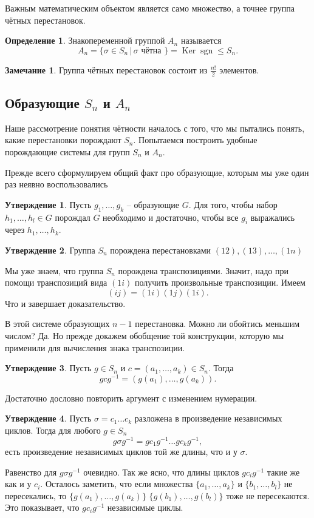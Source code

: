 \documentclass[10pt,a4paper,oneside]{book}
\theoremstyle{definition}
\newtheorem*{rem}{\color{green!50!blue}Замечание}
\newtheorem*{defn}{\color{yellow!30!red} Определение}
\newtheorem{utvr}{\color{blue!50!black}Утверждение}
\renewcommand{\leq}{\leqslant}
\DeclareMathOperator{\Ker}{Ker}
\newcommand{\sgn}{\operatorname{sgn}}
\def\dfn{\begin{defn}}
\def\edfn{\end{defn}}
\def\rm{\begin{rem}}
\def\erm{\end{rem}}
\def\utv{\begin{utvr}}
\def\eutv{\end{utvr}}
\begin{document}
Важным математическим объектом является само множество, а точнее группа чётных перестановок.

\dfn Знакопеременной группой $A_n$ называется
$$A_n=\{\sigma \in S_n\,|\, \sigma \text{ чётна } \} = \Ker \sgn \leq S_n.$$
\edfn

\rm Группа чётных перестановок состоит из $\frac{n!}{2}$ элементов.
\erm

\subsection{Образующие $S_n$ и $A_n$}

Наше рассмотрение понятия чётности началось с того, что мы пытались понять, какие перестановки порождают $S_n$. Попытаемся построить удобные порождающие системы для групп $S_n$ и $A_n$.

Прежде всего сформулируем общий факт про образующие, которым мы уже один раз неявно воспользовались

\utv Пусть $g_1,\dots,g_k $ -- образующие $G$. Для того, чтобы набор $h_1,\dots,h_l\in G$ порождал  $G$ необходимо и достаточно, чтобы все $g_i$ выражались через $h_1,\dots,h_k$. 
\eutv

\utv Группа $S_n$ порождена перестановками $(12), (13),\dots, (1n)$
\eutv
\proof Мы уже знаем, что группа $S_n$ порождена транспозициями. Значит, надо при помощи транспозиций вида $(1i)$ получить произвольные транспозиции.  Имеем
$$(ij)=(1i)(1j)(1i).$$
Что и завершает доказательство.
\endproof

В этой системе образующих $n-1$ перестановка. Можно ли обойтись меньшим числом? Да. Но прежде докажем обобщение той конструкции, которую мы применили для вычисления знака транспозиции.

\utv Пусть $g\in S_n$ и $c=(a_1,\dots,a_k)\in S_n$. Тогда 
$$gcg^{-1}=(g(a_1),\dots,g(a_k)).$$
\eutv
\proof Достаточно дословно повторить аргумент с изменением нумерации.
\endproof

\utv Пусть $\sigma=c_1\dots c_k$ разложена в произведение независимых циклов. Тогда для любого $g\in S_n$
$$g\sigma g^{-1}= gc_1 g^{-1}\dots gc_kg^{-1},$$
есть произведение независимых циклов той же длины, что и у $\sigma$.
\eutv
\proof Равенство для $g\sigma g^{-1}$ очевидно. Так же ясно, что длины циклов $gc_i g^{-1}$ такие же как и у $c_i$. Осталось заметить, что если множества $\{a_1,\dots,a_k\}$ и $\{b_1,\dots,b_l\}$ не пересекались, то $\{g(a_1),\dots,g(a_k)\}$ $\{g(b_1),\dots,g(b_l)\}$ тоже не пересекаются. Это показывает, что $gc_i g^{-1}$ независимые циклы.
\endproof
\end{document}
